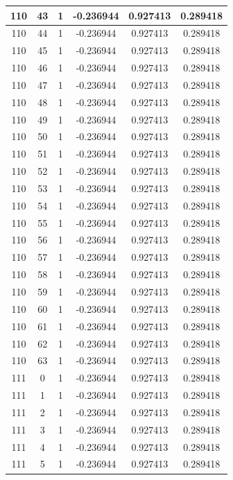 \documentclass[12pt,a4paper]{article}
\numberwithin{equation}{section}
\numberwithin{figure}{section}
\numberwithin{table}{section}
\begin{document}
\begin{longtable}{|c|c|c|c|c|c|}
110 & 43 & 1 & -0.236944 & 0.927413 & 0.289418 \\ \hline
110 & 44 & 1 & -0.236944 & 0.927413 & 0.289418 \\ \hline
110 & 45 & 1 & -0.236944 & 0.927413 & 0.289418 \\ \hline
110 & 46 & 1 & -0.236944 & 0.927413 & 0.289418 \\ \hline
110 & 47 & 1 & -0.236944 & 0.927413 & 0.289418 \\ \hline
110 & 48 & 1 & -0.236944 & 0.927413 & 0.289418 \\ \hline
110 & 49 & 1 & -0.236944 & 0.927413 & 0.289418 \\ \hline
110 & 50 & 1 & -0.236944 & 0.927413 & 0.289418 \\ \hline
110 & 51 & 1 & -0.236944 & 0.927413 & 0.289418 \\ \hline
110 & 52 & 1 & -0.236944 & 0.927413 & 0.289418 \\ \hline
110 & 53 & 1 & -0.236944 & 0.927413 & 0.289418 \\ \hline
110 & 54 & 1 & -0.236944 & 0.927413 & 0.289418 \\ \hline
110 & 55 & 1 & -0.236944 & 0.927413 & 0.289418 \\ \hline
110 & 56 & 1 & -0.236944 & 0.927413 & 0.289418 \\ \hline
110 & 57 & 1 & -0.236944 & 0.927413 & 0.289418 \\ \hline
110 & 58 & 1 & -0.236944 & 0.927413 & 0.289418 \\ \hline
110 & 59 & 1 & -0.236944 & 0.927413 & 0.289418 \\ \hline
110 & 60 & 1 & -0.236944 & 0.927413 & 0.289418 \\ \hline
110 & 61 & 1 & -0.236944 & 0.927413 & 0.289418 \\ \hline
110 & 62 & 1 & -0.236944 & 0.927413 & 0.289418 \\ \hline
110 & 63 & 1 & -0.236944 & 0.927413 & 0.289418 \\ \hline
111 & 0 & 1 & -0.236944 & 0.927413 & 0.289418 \\ \hline
111 & 1 & 1 & -0.236944 & 0.927413 & 0.289418 \\ \hline
111 & 2 & 1 & -0.236944 & 0.927413 & 0.289418 \\ \hline
111 & 3 & 1 & -0.236944 & 0.927413 & 0.289418 \\ \hline
111 & 4 & 1 & -0.236944 & 0.927413 & 0.289418 \\ \hline
111 & 5 & 1 & -0.236944 & 0.927413 & 0.289418 \\ \hline

\end{longtable}
\end{document}
